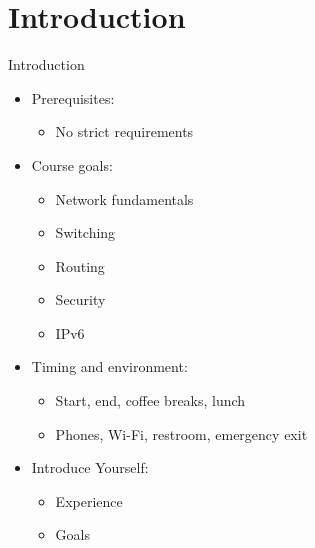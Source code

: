 \section[intro]{Introduction}

\begin{frame}{Introduction}
	\begin{itemize}[<+->]
		\item Prerequisites:
		\begin{itemize}
			\item No strict requirements
		\end{itemize}
		\item Course goals:
		\begin{itemize}
			\item Network fundamentals
			\item Switching
			\item Routing
			\item Security
			\item IPv6
		\end{itemize}
		\item Timing and environment:
		\begin{itemize}
			\item Start, end, coffee breaks, lunch
			\item Phones, Wi-Fi, restroom, emergency exit
		\end{itemize}
		\item Introduce Yourself:
		\begin{itemize}
			\item Experience
			\item Goals
		\end{itemize}
	\end{itemize}
\end{frame}
